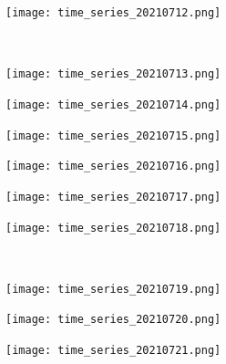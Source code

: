 \documentclass[10pt]{article}
\begin{document}
\begin{figure}[!h]
\begin{subfigure}[b]{0.166\linewidth}
    \end{subfigure}%
        \begin{subfigure}[b]{0.166\linewidth}
        \centering
        \texttt{[image: time\_series\_20210712.png]}
    \end{subfigure}
    \\
    \begin{subfigure}[b]{0.166\linewidth}
        \centering
        \texttt{[image: time\_series\_20210713.png]}
    \end{subfigure}%
    \begin{subfigure}[b]{0.166\linewidth}
        \centering
        \texttt{[image: time\_series\_20210714.png]}
    \end{subfigure}%
    \begin{subfigure}[b]{0.166\linewidth}
        \centering
        \texttt{[image: time\_series\_20210715.png]}
    \end{subfigure}%
    \begin{subfigure}[b]{0.166\linewidth}
        \centering
        \texttt{[image: time\_series\_20210716.png]}
    \end{subfigure}%
        \begin{subfigure}[b]{0.166\linewidth}
        \centering
        \texttt{[image: time\_series\_20210717.png]}
    \end{subfigure}%
    \begin{subfigure}[b]{0.166\linewidth}
        \centering
        \texttt{[image: time\_series\_20210718.png]}
    \end{subfigure}
    \\
    \begin{subfigure}[b]{0.166\linewidth}
        \centering
        \texttt{[image: time\_series\_20210719.png]}
    \end{subfigure}%
    \begin{subfigure}[b]{0.166\linewidth}
        \centering
        \texttt{[image: time\_series\_20210720.png]}
    \end{subfigure}%
    \begin{subfigure}[b]{0.166\linewidth}
        \centering
        \texttt{[image: time\_series\_20210721.png]}
    \end{subfigure}%
        \begin{subfigure}[b]{0.166\linewidth}

\end{subfigure}
\end{figure}
\end{document}
